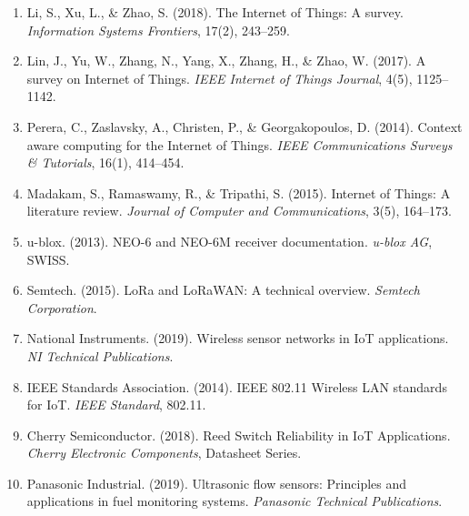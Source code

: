 \documentclass[twocolumn, 10pt]{article}
\begin{document}
\begin{enumerate}
\item Li, S., Xu, L., \& Zhao, S. (2018). The Internet of Things: A survey. \textit{Information Systems Frontiers}, 17(2), 243--259.

\item Lin, J., Yu, W., Zhang, N., Yang, X., Zhang, H., \& Zhao, W. (2017). A survey on Internet of Things. \textit{IEEE Internet of Things Journal}, 4(5), 1125--1142.

\item Perera, C., Zaslavsky, A., Christen, P., \& Georgakopoulos, D. (2014). Context aware computing for the Internet of Things. \textit{IEEE Communications Surveys \& Tutorials}, 16(1), 414--454.

\item Madakam, S., Ramaswamy, R., \& Tripathi, S. (2015). Internet of Things: A literature review. \textit{Journal of Computer and Communications}, 3(5), 164--173.
\item u-blox. (2013). NEO-6 and NEO-6M receiver documentation. \textit{u-blox AG}, SWISS.

\item Semtech. (2015). LoRa and LoRaWAN: A technical overview. \textit{Semtech Corporation}.

\item National Instruments. (2019). Wireless sensor networks in IoT applications. \textit{NI Technical Publications}.

\item IEEE Standards Association. (2014). IEEE 802.11 Wireless LAN standards for IoT. \textit{IEEE Standard}, 802.11.

\item Cherry Semiconductor. (2018). Reed Switch Reliability in IoT Applications. \textit{Cherry Electronic Components}, Datasheet Series.

\item Panasonic Industrial. (2019). Ultrasonic flow sensors: Principles and applications in fuel monitoring systems. \textit{Panasonic Technical Publications}.
\end{enumerate}
\end{document}
